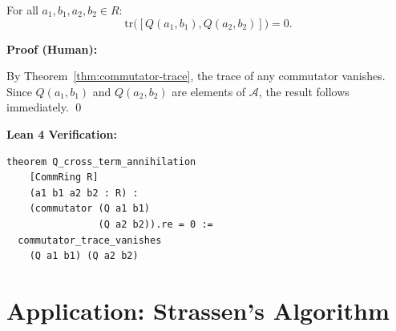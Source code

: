 \begin{theorem}
\label{thm:cross-term}
For all $a_1, b_1, a_2, b_2 \in R$:
\[
  \mathrm{tr}\bigl([Q(a_1, b_1), Q(a_2, b_2)]\bigr) = 0.
\]

\begin{minipage}[t]{0.48\textwidth}
\textbf{Proof (Human):}

By Theorem~\ref{thm:commutator-trace}, the trace of any commutator
vanishes. Since $Q(a_1, b_1)$ and $Q(a_2, b_2)$ are elements of
$\mathcal{A}$, the result follows immediately. \qed
\end{minipage}
\hfill
\begin{minipage}[t]{0.48\textwidth}
\textbf{Lean 4 Verification:}
\begin{lstlisting}[language=lean,basicstyle=\ttfamily\scriptsize]
theorem Q_cross_term_annihilation
    [CommRing R]
    (a1 b1 a2 b2 : R) :
    (commutator (Q a1 b1)
                (Q a2 b2)).re = 0 :=
  commutator_trace_vanishes
    (Q a1 b1) (Q a2 b2)
\end{lstlisting}
\end{minipage}
\end{theorem}

\section{Application: Strassen's Algorithm}
\label{sec:strassen}

